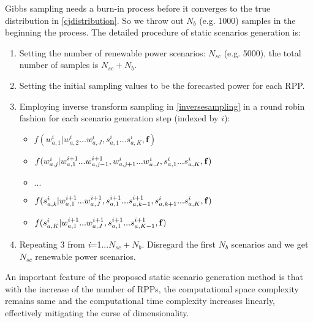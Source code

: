 Gibbs sampling needs a burn-in process \cite{burn_in} before it converges to the true distribution in \eqref{cjdistribution}. So we throw out $N_{b}$ (e.g. 1000) samples in the beginning the process. The detailed procedure of static scenarios generation is:
\begin{enumerate}%
	\item Setting the number of renewable power scenarios: $N_{sc}$ (e.g. 5000), the total number of samples is $N_{sc}+N_{b}$.
	\item Setting the initial sampling values to be the forecasted power for each RPP.
	\item Employing inverse transform sampling in \eqref{inversesampling} in a round robin fashion for each scenario generation step (indexed by $i$):

\begin{itemize}
	\item $f(w_{a,{1}}^{i}|w_{a,2}^{i}...w_{a,J}^{i},s_{a,{1}}^{i}...s_{a,K}^{i},\mathbf{f})$
	\item $f(w_{a,{\it j}}^{i}|w_{a,{1}}^{i+1}...w_{a,{{\it j}-1}}^{i+1},w_{a,{{\it j}+1}}^{i}...w_{a,J}^{i},s_{a,{1}}^{i}...s_{a,K}^{i},\mathbf{f})$
	\item $...$
	\item $f(s_{a,{\it k}}^{i}|w_{a,{1}}^{i+1}...w_{a,J}^{i+1},s_{a,{1}}^{i+1}...s_{a,{{\it k}-1}}^{i+1},s_{a,{{\it k}+1}}^{i}...s_{a,K}^{i},\mathbf{f})$
	\item $f(s_{a,{\it K}}^{i}|w_{a,{1}}^{i+1}...w_{a,J}^{i+1},s_{a,{1}}^{i+1}...s_{a,{{\it K}-1}}^{i+1},\mathbf{f})$
\end{itemize}

	\item Repeating 3 from {\it i}=1...$N_{sc}+N_{b}$. Disregard the first $N_{b}$ scenarios and we get $N_{sc}$ renewable power scenarios.

\end{enumerate}

{An important feature of the proposed static scenario generation method is that with the increase of the number of RPPs, the computational space complexity remains same and the computational time complexity increases linearly, effectively mitigating the curse of dimensionality.}

